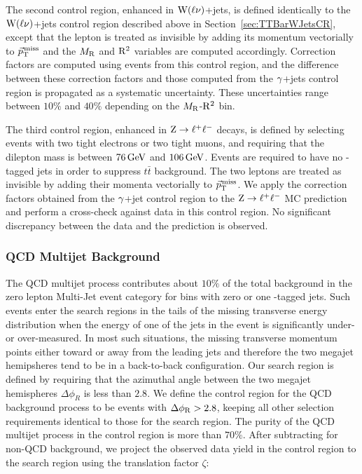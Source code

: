 The second control region, enhanced in $\mathrm{W}(\ell\nu)$+jets, is defined identically to the $\mathrm{W}(\ell\nu)$+jets control region described
above in Section~\ref{sec:TTBarWJetsCR}, except that the lepton is treated as invisible
by adding its momentum vectorially to ${\vec p}_{\mathrm{T}}^{\kern1pt\text{miss}}$ and the $M_\mathrm{R}$ and $\mathrm{R}^2$
variables are computed accordingly. Correction factors are computed using events from this control region,
and the difference between these correction factors and those computed from the $\gamma$+jets control region
is propagated as a systematic uncertainty.  These uncertainties range between $10\%$ and $40\%$ depending on the $M_\mathrm{R}$-$\mathrm{R}^2$ bin. 

The third control region, enhanced in $\mathrm{Z}\to\ell^+\ell^-$ decays, 
is defined by selecting events with two tight electrons or two tight muons, and requiring that the dilepton mass is
between $76\,\text{Ge\hspace{-.08em}V}$ and $106\,\text{Ge\hspace{-.08em}V}$. Events are required to have no \PQb-tagged jets
in order to suppress $t\bar{t}$ background. The two leptons are treated as invisible by adding their
momenta vectorially to ${\vec p}_{\mathrm{T}}^{\kern1pt\text{miss}}$. We apply the correction factors obtained from the
$\gamma$+jet control region to the $\mathrm{Z}\to\ell^+\ell^-$ MC prediction and perform a cross-check against data
in this control region. No significant discrepancy between the data and the prediction is observed.

\subsubsection{QCD Multijet Background}
\label{sec:QCDCR}
The QCD multijet process contributes about $10\%$ of the total background in the zero lepton Multi-Jet
event category for bins with zero or one \PQb-tagged jets. Such events enter the search regions
in the tails of the missing transverse energy distribution when the energy of 
one of the jets in the event is significantly under- or over-measured. 
In most such situations, the missing transverse momentum points either toward
or away from the leading jets and therefore the two megajet hemipsheres tend to
be in a back-to-back configuration. Our search region is defined by requiring that
the azimuthal angle between the two megajet hemispheres $\Delta\phi_R$ is less than
$2.8$. We define the control region for the QCD background process to be events
with $\Delta\phi_\mathrm{R}>2.8$, keeping all other selection requirements identical to those for
the search region. The purity of the QCD multijet process in the control region
is more than $70\%$. After subtracting for non-QCD background,
we project the observed data yield in the control region to the search region using
the translation factor $\zeta$:

